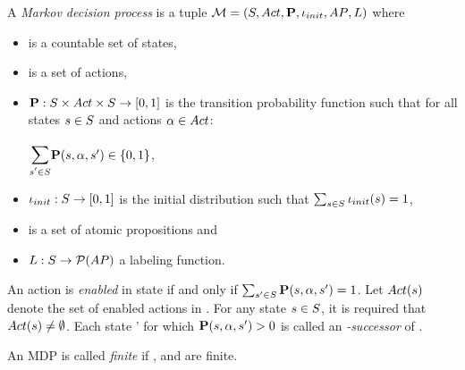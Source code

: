 \documentclass[preview]{standalone}
\begin{document}
	\begin{definition}
		A \emph{Markov decision process} is a tuple ${{\mathcal{M}}} = {({S}, {Act}, {\textbf{P}}, {\iota_{init}}, {AP}, {L})}$ where
		\begin{itemize}
			\item \states is a countable set of states,
			\item \actions is a set of actions,
			\item ${\textbf{P}} : {S} \times {Act} \times {S} \to [0,1]$ is the transition probability function such that for all states ${s} \in {S}$ and actions ${\alpha} \in {Act}$:
			\begin{center}
				$\bbigsum{\state' \in \states}\probtfunc(\state,\action,\state') \in \{0,1\}$,
			\end{center}
			\item ${\iota_{init}} : {S} \to [0,1]$ is the initial distribution such that $\sum_{{s} \in {S}} {\iota_{init}}({s}) = 1$,
			\item \atomicprops is  a set of atomic propositions and
			\item ${L} : {S} \to {\mathcal{P}(\ensuremath{{AP}})}$ a labeling function.
		\end{itemize}
		An action \action is \emph{enabled} in state \state if and only if $\sum_{{s}' \in {S}} {\textbf{P}}({s},{\alpha},{s}') = 1$. Let ${Act}({s})$ denote the set of enabled actions in \state. For any state ${s} \in {S}$, it is required that ${Act}({s}) \neq \emptyset$. Each state \state' for which ${\textbf{P}}({s},{\alpha},{s}') > 0$ is called an \emph{\action-successor} of \state.
	\end{definition}
	
	An MDP is called \emph{finite} if \states, \actions and \atomicprops are finite.
	\\
	
	
\end{document}
